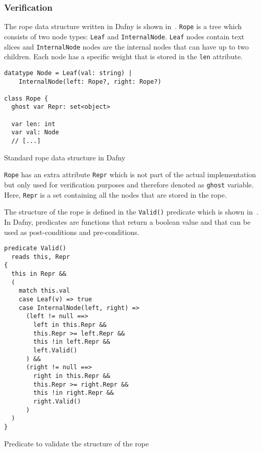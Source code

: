 \subsubsection{Verification}

The rope data structure written in Dafny is shown in~.
\texttt{Rope} is a tree which consists of two node types: \texttt{Leaf} and \texttt{InternalNode}.
\texttt{Leaf} nodes contain text slices and \texttt{InternalNode} nodes are the internal nodes that can have up to two children.
Each node has a specific weight that is stored in the \texttt{len} attribute.


\begin{listing}[h!]
\begin{verbatim}
datatype Node = Leaf(val: string) |
    InternalNode(left: Rope?, right: Rope?)

class Rope {
  ghost var Repr: set<object>

  var len: int
  var val: Node
  // [...]
\end{verbatim}
    \caption{Standard rope data structure in Dafny}
    \label{lst:rope}
\end{listing}

\texttt{Rope} has an extra attribute \texttt{Repr} which is not part of the actual implementation but only used for verification purposes and therefore denoted as \texttt{ghost} variable.
Here, \texttt{Repr} is a set containing all the nodes that are stored in the rope.

The structure of the rope is defined in the \texttt{Valid()} predicate which is shown in~.
In Dafny, predicates are functions that return a boolean value and that can be used as post-conditions and pre-conditions.

\begin{listing}[h!]
\begin{verbatim}
predicate Valid()
  reads this, Repr
{
  this in Repr &&
  (
    match this.val
    case Leaf(v) => true
    case InternalNode(left, right) =>
      (left != null ==>
        left in this.Repr &&
        this.Repr >= left.Repr &&
        this !in left.Repr &&
        left.Valid()
      ) &&
      (right != null ==>
        right in this.Repr &&
        this.Repr >= right.Repr &&
        this !in right.Repr &&
        right.Valid()
      )
  )
}
\end{verbatim}
    \caption{Predicate to validate the structure of the rope}
    \label{lst:rope-valid}
\end{listing}

